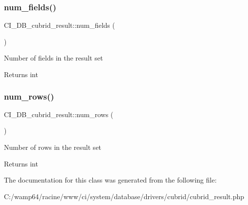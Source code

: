 \subsubsection{\texorpdfstring{num\+\_\+fields()}{num\_fields()}}
{\footnotesize\ttfamily C\+I\+\_\+\+D\+B\+\_\+cubrid\+\_\+result\+::num\+\_\+fields (\begin{DoxyParamCaption}{ }\end{DoxyParamCaption})}

Number of fields in the result set

\begin{DoxyReturn}{Returns}
int 
\end{DoxyReturn}
\mbox{\label{class_c_i___d_b__cubrid__result_a24234b006b5f5f551db67f8799b1660e}} 
\subsubsection{\texorpdfstring{num\+\_\+rows()}{num\_rows()}}
{\footnotesize\ttfamily C\+I\+\_\+\+D\+B\+\_\+cubrid\+\_\+result\+::num\+\_\+rows (\begin{DoxyParamCaption}{ }\end{DoxyParamCaption})}

Number of rows in the result set

\begin{DoxyReturn}{Returns}
int 
\end{DoxyReturn}


The documentation for this class was generated from the following file\+:\begin{DoxyCompactItemize}
\item 
C\+:/wamp64/racine/www/ci/system/database/drivers/cubrid/cubrid\+\_\+result.\+php\end{DoxyCompactItemize}

